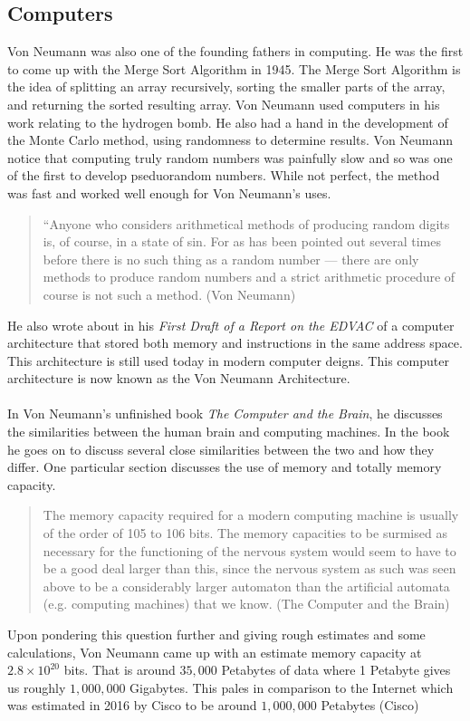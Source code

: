 \documentclass[12pt]{article}
\begin{document}
\subsection*{Computers}
Von Neumann was also one of the founding fathers in computing. He was the first to come up with the Merge Sort Algorithm in 1945. The Merge Sort Algorithm is the idea of splitting an array recursively, sorting the smaller parts of the array, and returning the sorted resulting array. Von Neumann used computers in his work relating to the hydrogen bomb. He also had a hand in the development of the Monte Carlo method, using randomness to determine results. Von Neumann notice that computing truly random numbers was painfully slow and so was one of the first to develop pseduorandom numbers. While not perfect, the method was fast and worked well enough for Von Neumann's uses. 

\begin{quotation}
	``Anyone who considers arithmetical methods of producing random digits is, of course, in a state of sin. For as has been pointed out several times before there is no such thing as a random number --- there are only methods to produce random numbers and a strict arithmetic procedure of course is not such a method. (Von Neumann)
\end{quotation}

He also wrote about in his \textit{First Draft of a Report on the EDVAC} of a computer architecture that stored both memory and instructions in the same address space. This architecture is still used today in modern computer deigns. This computer architecture is now known as the Von Neumann Architecture.\\
\\
In Von Neumann's unfinished book \textit{The Computer and the Brain}, he discusses the similarities between the human brain and computing machines. In the book he goes on to discuss several close similarities between the two and how they differ. One particular section discusses the use of memory and totally memory capacity.
\begin{quotation}
	The memory capacity required for a modern computing machine is usually of the order of 105 to 106 bits. The memory capacities to be surmised as necessary for the functioning of the nervous system would seem to have to be a good deal larger than this, since the nervous system as such was seen above to be a considerably larger automaton than the artificial automata (e.g. computing machines)	that we know. (The Computer and the Brain)
\end{quotation}
	Upon pondering this question further and giving rough estimates and some calculations, Von Neumann came up with an estimate memory capacity at $ 2.8 \times 10^{20} $ bits. That is around $ 35,000 $ Petabytes of data where 1 Petabyte gives us roughly $ 1,000,000 $ Gigabytes. This pales in comparison to the Internet which was estimated in 2016 by Cisco to be around $ 1,000,000 $ Petabytes (Cisco)
\end{document}
